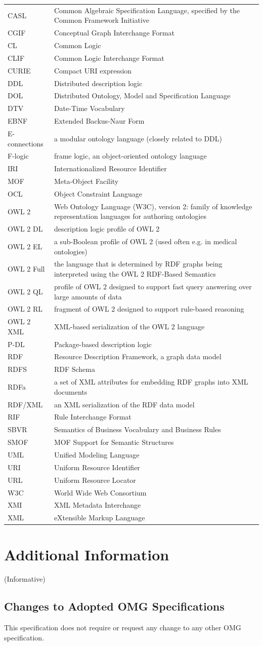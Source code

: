 \documentclass[10pt,fleqn,final]{scrreprt}
\makeatletter
\newcommand*{\eg}{e.g.\@\xspace}
\newenvironment{symbols}[0]{\begin{longtable}{p{.15\textwidth}p{.84\textwidth}}}{\end{longtable}}
\newcommand{\symboldef}[2]{ #1 & #2 \\}
\newcommand{\informative}[0]{{\begin{center}{\Large{(Informative})}\end{center}} \bigskip}
\newcommand{\clauseI}[1]{\chapter{#1} \informative }
\newenvironment{definitions}[0]{\medskip }{}
\makeatother
\begin{document}
\begin{definitions}
\begin{symbols}
\symboldef{CASL}{Common Algebraic Specification Language, specified by the Common Framework Initiative}
\symboldef{CGIF}{Conceptual Graph Interchange Format}
\symboldef{CL}{Common Logic }
\symboldef{CLIF}{Common Logic Interchange Format}
\symboldef{CURIE}{Compact URI expression}
\symboldef{DDL}{Distributed description logic}
\symboldef{DOL}{Distributed Ontology, Model and Specification Language}
\symboldef{DTV}{Date-Time Vocabulary}
\symboldef{EBNF}{Extended Backus-Naur Form}
\symboldef{E-connections}{a modular ontology language (closely related to DDL)}
\symboldef{F-logic}{frame logic, an object-oriented ontology language}
\symboldef{IRI}{Internationalized Resource Identifier}
\symboldef{MOF}{Meta-Object Facility}
\symboldef{OCL}{Object Constraint Language}
\symboldef{OWL 2}{Web Ontology Language (W3C), version 2: family of knowledge representation languages for authoring ontologies}
\symboldef{OWL 2 DL}{description logic profile of OWL 2}
\symboldef{OWL 2 EL}{a sub-Boolean profile of OWL 2 (used often \eg in medical ontologies)}
\symboldef{OWL 2 Full}{the language that is determined by RDF graphs being interpreted 
using the OWL 2 RDF-Based Semantics \cite{W3C:REC-owl2-rdf-based-semantics-20091027}}
\symboldef{OWL 2 QL}{profile of OWL 2 designed to support fast query answering over large amounts of data}
\symboldef{OWL 2 RL}{fragment of OWL 2 designed to support rule-based reasoning}
\symboldef{OWL 2 XML}{XML-based serialization of the OWL 2 language}
\symboldef{P-DL}{Package-based description logic}
\symboldef{RDF}{Resource Description Framework, a graph data model}
\symboldef{RDFS}{RDF Schema}
\symboldef{RDFa}{a set of XML attributes for embedding RDF graphs into XML documents}
\symboldef{RDF/XML}{an XML serialization of the RDF data model}
\symboldef{RIF}{Rule Interchange Format}
\symboldef{SBVR}{Semantics of Business Vocabulary and Business Rules}
\symboldef{SMOF}{MOF Support for Semantic Structures}
\symboldef{UML}{Unified Modeling Language}
\symboldef{URI}{Uniform Resource Identifier}
\symboldef{URL}{Uniform Resource Locator}
\symboldef{W3C}{World Wide Web Consortium}
\symboldef{XMI}{XML Metadata Interchange}
\symboldef{XML}{eXtensible Markup Language}
\end{symbols}


\clauseI{Additional Information}

\section{Changes to Adopted OMG Specifications}
This specification does not require or request any change to any other OMG specification. 


\end{definitions}
\end{document}
